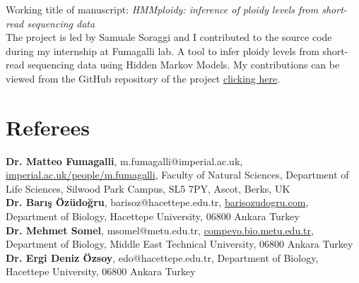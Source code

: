 \documentclass[letterpaper,11pt]{article}
\begin{document}
Working title of manuscript: \textit{HMMploidy: inference of ploidy levels from short-read sequencing data}\\
The project is led by Samuale Soraggi and I contributed to the source code during my internship at Fumagalli lab. A tool to infer ploidy levels from short-read sequencing data using Hidden Markov Models. My contributions can be viewed from the GitHub repository of the project \href {https://github.com/SamueleSoraggi/HMMploidy}{clicking here}.



\section{Referees}
\textbf{Dr. Matteo Fumagalli}, m.fumagalli@imperial.ac.uk, \href{https://www.imperial.ac.uk/people/m.fumagalli}{imperial.ac.uk/people/m.fumagalli}, Faculty of Natural Sciences, Department of Life Sciences, Silwood Park Campus, SL5 7PY, Ascot, Berks, UK \\
\textbf{Dr. Bar{\i}\c{s} \"{O}z\"{u}do\u{g}ru}, barisoz@hacettepe.edu.tr, \href{https://www.barisozudogru.com/}{barisozudogru.com}, Department of Biology, Hacettepe University, 06800 Ankara Turkey \\
\textbf{Dr. Mehmet Somel}, msomel@metu.edu.tr, \href{http://compevo.bio.metu.edu.tr}{compevo.bio.metu.edu.tr}, Department of Biology, Middle East Technical University, 06800 Ankara Turkey \\
\textbf{Dr. Ergi Deniz \"{O}zsoy}, edo@hacettepe.edu.tr, Department of Biology, Hacettepe University, 06800 Ankara Turkey  \\

\end{document}
